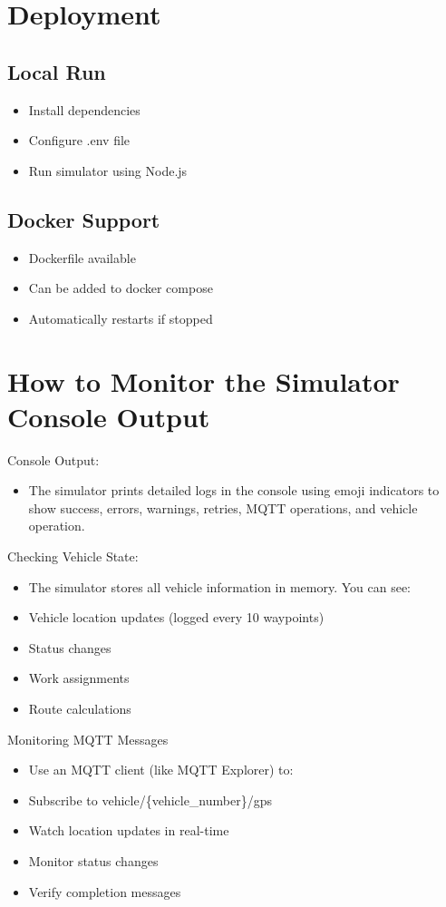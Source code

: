 \section{Deployment}

\subsection{Local Run}
\begin{itemize}
    \item Install dependencies
    \item Configure .env file
    \item Run simulator using Node.js
\end{itemize}

\subsection{Docker Support}
\begin{itemize}
    \item Dockerfile available
    \item Can be added to docker compose
    \item Automatically restarts if stopped
\end{itemize}

\section{How to Monitor the Simulator Console Output}
Console Output:
\begin{itemize}
    \item The simulator prints detailed logs in the console using emoji indicators to show success, errors, warnings, retries, MQTT operations, and vehicle operation.
\end{itemize}

Checking Vehicle State:
\begin{itemize}
    \item The simulator stores all vehicle information in memory. You can see:
    \item Vehicle location updates (logged every 10 waypoints)
    \item Status changes
    \item Work assignments
    \item Route calculations
\end{itemize}

Monitoring MQTT Messages
\begin{itemize}
    \item Use an MQTT client (like MQTT Explorer) to:
    \item Subscribe to vehicle/\{vehicle\_number\}/gps
    \item Watch location updates in real-time
    \item Monitor status changes
    \item Verify completion messages
\end{itemize}

